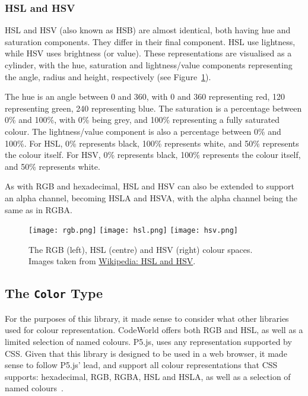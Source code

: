 \documentclass[../main.tex]{subfiles}
\begin{document}
        \subsubsection{HSL and HSV}
            HSL and HSV (also known as HSB) are almost identical, both having hue and
                saturation components.
            They differ in their final component.
            HSL use lightness, while HSV uses brightness (or value).
            These representations are visualised as a cylinder, with the hue, saturation
                and lightness/value components representing the angle, radius and height,
                respectively (see Figure~\ref{fig:colourSpaces}).

            The hue is an angle between 0\textdegree{} and 360\textdegree{}, with
                0\textdegree{} and 360\textdegree{} representing red, 120\textdegree{}
                representing green, 240\textdegree{} representing blue.
            The saturation is a percentage between 0\% and 100\%, with 0\% being grey, and
                100\% representing a fully saturated colour.
            The lightness/value component is also a percentage between 0\% and 100\%.
            For HSL, 0\% represents black, 100\% represents white, and 50\% represents the
                colour itself.
            For HSV, 0\% represents black, 100\% represents the colour itself, and 50\%
                represents white.

            As with RGB and hexadecimal, HSL and HSV can also be extended to support an
                alpha channel, becoming HSLA and HSVA, with the alpha channel being the same as
                in RGBA.

            \begin{figure}[H]
                \centering
                \texttt{[image: rgb.png]}
                \texttt{[image: hsl.png]}
                \texttt{[image: hsv.png]}
                    \caption{The RGB (left), HSL (centre) and HSV (right) colour spaces.
                        Images taken from \href{https://en.wikipedia.org/wiki/HSL_and_HSV}{Wikipedia:
                                HSL and HSV}.
                    }
                    \label{fig:colourSpaces}
            \end{figure}

        \subsection{The \texttt{Color}
            Type} For the purposes of this library, it made sense to consider what other
                libraries used for colour representation.
            CodeWorld offers both RGB and HSL, as well as a limited selection of named
                colours.
            P5.js, uses any representation supported by CSS.
            Given that this library is designed to be used in a web browser, it made sense
                to follow P5.js' lead, and support all colour representations that CSS
                supports: hexadecimal, RGB, RGBA, HSL and HSLA, as well as a selection of named
                colours~\citep{cssColours}.
\end{document}
